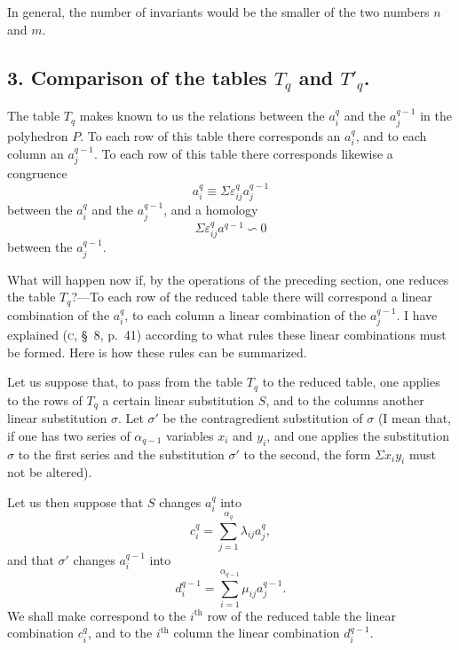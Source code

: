 \documentclass{article}
\begin{document}
In general, the number of invariants would be the smaller of the two numbers $n$ and $m$.

\subsection*{3. Comparison of the tables $T_{q}$ and $T'_{q}$.}

The table $T_{q}$ makes known to us the relations between the $a^{q}_{i}$ and the $a^{q-1}_{j}$ in the polyhedron $P$. To each row of this table there corresponds an $a^{q}_{i}$, and to each column an $a^{q-1}_{j}$. To each row of this table there corresponds likewise a congruence
\[ a^{q}_{i} \equiv \Sigma \varepsilon^{q}_{ij} a^{q-1}_{j} \tag{1} \]
between the $a^{q}_{i}$ and the $a^{q-1}_{j}$, and a homology
\[ \Sigma \varepsilon^{q}_{ij} a^{q-1} \backsim 0 \tag{2} \]
between the $a^{q-1}_{j}$.

What will happen now if, by the operations of the preceding section, one reduces the table $T_{q}$?---To each row of the reduced table there will correspond a linear combination of the $a^{q}_{i}$, to each column a linear combination of the $a^{q-1}_{j}$. I have explained (\textsc{c}, \S~8, p.\ 41) according to what rules these linear combinations must be formed. Here is how these rules can be summarized.

Let us suppose that, to pass from the table $T_{q}$ to the reduced table, one applies to the rows of $T_{q}$ a certain linear substitution $S$, and to the columns another linear substitution $\sigma$. Let $\sigma'$ be the contragredient substitution of $\sigma$ (I mean that, if one has two series of $\alpha_{q-1}$ variables $x_{i}$ and $y_{i}$, and one applies the substitution $\sigma$ to the first series and the substitution $\sigma'$ to the second, the form $\Sigma x_{i} y_{i}$ must not be altered).

Let us then suppose that $S$ changes $a^{q}_{i}$ into
\[ c^{q}_{i} = \sum_{j=1}^{\alpha_{q}} \lambda_{ij} a^{q}_{j}, \]
and that $\sigma'$ changes $a^{q-1}_{i}$ into
\[ d^{q-1}_{i} = \sum_{i=1}^{\alpha_{q-1}} \mu_{ij} a^{q-1}_{j}. \]
We shall make correspond to the $i^{\text{th}}$ row of the reduced table the linear combination $c^{q}_{i}$, and to the $i^{\text{th}}$ column the linear combination $d^{q-1}_{i}$.
\end{document}
